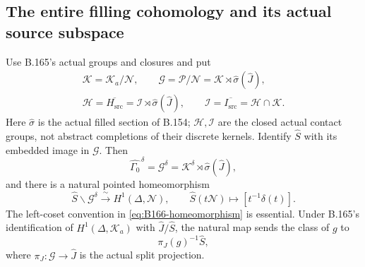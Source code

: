 \subsection*{The entire filling cohomology and its actual source subspace}
\label{stmt:B166}
Use B.165's actual groups and closures and put
\[
 \begin{gathered}
 \mathcal K=\mathcal K_a/\mathcal N,\qquad
 \mathcal G=\mathcal P/\mathcal N
       =\mathcal K\rtimes\widehat\sigma(\widehat J),\\
 \mathcal H=\overline{H_{\mathrm{src}}}
       =\mathcal I\rtimes\widehat\sigma(\widehat J),
 \qquad
 \mathcal I=\overline{I_{\mathrm{src}}}
       =\mathcal H\cap\mathcal K .
 \end{gathered}
\]
Here \(\widehat\sigma\) is the actual filled section of B.154;
\(\mathcal H,\mathcal I\) are the closed actual contact groups,
not abstract completions of their discrete kernels.
Identify \(\widehat S\) with its embedded image in \(\mathcal G\).
Then
\begin{equation}\label{eq:B166-fixed}
 \widehat{\Gamma_0}^{\,\delta}
     =\mathcal G^\delta
     =\mathcal K^\delta\rtimes\widehat\sigma(\widehat J),
\end{equation}
and there is a natural pointed homeomorphism
\begin{equation}\label{eq:B166-homeomorphism}
 \widehat S\backslash\mathcal G^\delta
   \xrightarrow{\ \sim\ }H^1(\Delta,\mathcal N),
 \qquad
 \widehat S(t\mathcal N)\longmapsto[t^{-1}\delta(t)].
\end{equation}
The left-coset convention in \eqref{eq:B166-homeomorphism} is
essential. Under B.165's identification of
\(H^1(\Delta,\mathcal K_a)\) with \(\widehat J/\widehat S\),
the natural map sends the class of \(g\) to
\begin{equation}\label{eq:B166-inversion}
                   \pi_J(g)^{-1}\widehat S,
\end{equation}
where \(\pi_J:\mathcal G\to\widehat J\) is the actual split projection.

